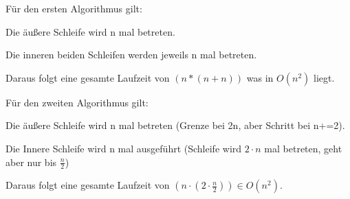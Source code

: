 Für den ersten Algorithmus gilt:

Die äußere Schleife wird n mal betreten.

Die inneren beiden Schleifen werden jeweils n mal betreten.

Daraus folgt eine gesamte Laufzeit von $(n*(n+n))$ was in $O(n^2)$ liegt.



Für den zweiten Algorithmus gilt:

Die äußere Schleife wird n mal betreten (Grenze bei 2n, aber Schritt bei n+=2).

Die Innere Schleife wird n mal ausgeführt (Schleife wird $2 \cdot n$ mal betreten, geht aber nur bis $ \frac{n}{2} $)

Daraus folgt eine gesamte Laufzeit von $(n \cdot (2 \cdot \frac{n}{2}) ) \in O(n^2)$.



